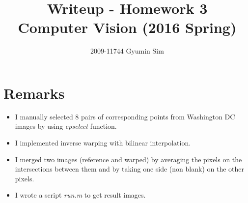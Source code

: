 \documentclass[a4paper,10pt]{article}
\begin{document}
\title{Writeup - Homework 3 \\
  \large Computer Vision (2016 Spring)}
\author{2009-11744 Gyumin Sim}
\maketitle

\section{Remarks}

\begin{itemize}
\item I manually selected 8 pairs of corresponding points from Washington DC images by using \textit{cpselect} function.
\item I implemented inverse warping with bilinear interpolation.
\item I merged two images (reference and warped) by averaging the pixels on the intersections between them and by taking one side (non blank) on the other pixels.
\item I wrote a script \textit{run.m} to get result images.
\end{itemize}
\end{document}

